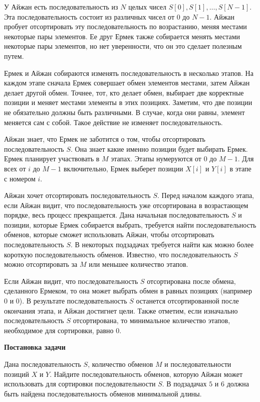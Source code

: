 У Айжан есть последовательность из $N$ целых чисел $S[0], S[1], \ldots, S[N - 1]$. Эта
последовательность состоит из различных чисел от $0$ до $N - 1$. Айжан пробует
отсортировать эту последовательность по возрастанию, меняя местами некоторые пары
элементов. Ее друг Ермек также собирается менять местами некоторые пары элементов, но
нет уверенности, что он это сделает полезным путем.

Ермек и Айжан собираются изменять последовательность в несколько этапов. На каждом
этапе сначала Ермек совершает обмен элементов местами, затем Айжан делает другой
обмен. Точнее, тот, кто делает обмен, выбирает две корректные позиции и меняет местами
элементы в этих позициях. Заметим, что две позиции не обязательно должны быть
различными. В случае, когда они равны, элемент меняется сам с собой. Такое действие не
изменяет последовательность.

Айжан знает, что Ермек не заботится о том, чтобы отсортировать последовательность $S$. Она
знает какие именно позиции будет выбирать Ермек. Ермек планирует участвовать в $M$ этапах.
Этапы нумеруются от $0$ до $M - 1$. Для всех от $i$ до $M - 1$ включительно, Ермек выберет позиции $X[i]$ и $Y[i]$ в этапе с номером $i$.

Айжан хочет отсортировать последовательность $S$. Перед началом каждого этапа, если
Айжан видит, что последовательность уже отсортирована в возрастающем порядке, весь
процесс прекращается. Дана начальная последовательность $S$ и позиции, которые Ермек
собирается выбрать, требуется найти последовательность обменов, которые сможет
использовать Айжан, чтобы отсортировать последовательность $S$. В некоторых подзадачах
требуется найти как можно более короткую последовательность обменов. Известно, что
последовательность $S$ можно отсортировать за $M$ или меньшее количество этапов.

Если Айжан видит, что последовательность $S$ отсортирована после обмена, сделанного
Ермеком, то она может выбрать обмен в равных позициях (например $0$ и $0$). В результате
последовательность $S$ останется отсортированной после окончания этапа, и Айжан достигнет
цели. Также отметим, если изначально последовательность $S$ отсортирована, то минимальное
количество этапов, необходимое для сортировки, равно $0$.

\textbf{Постановка задачи}

Дана последовательность $S$, количество обменов $M$ и последовательности позиций $X$ и $Y$.
Найдите последовательность обменов, которую Айжан может использовать для сортировки
последовательности $S$. В подзадачах $5$ и $6$ должна быть найдена последовательность обменов
минимальной длины.

